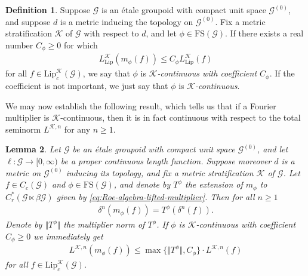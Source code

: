 \documentclass[11pt,a4paper,oneside,final,reqno]{amsart}
\newtheorem{lemma}{Lemma}[section]
\theoremstyle{definition}
\newtheorem{definition}[lemma]{Definition}
\newcommand{\G}{\mathcal{G}}
\newcommand{\Go}{\mathcal{G}^{(0)}}
\newcommand{\cK}{\mathcal{K}}
\newcommand{\FS}{\mathrm{FS}}
\newcommand{\Lip}{\mathrm{Lip}}
\newcommand{\Cred}{C_{r}^{*}}
\numberwithin{equation}{section}
\begin{document}
	
	\begin{definition}\label{def:K-continuous-multipliers}
		Suppose $\G$ is an \'etale groupoid with compact unit space $\Go$, and suppose  $d$ is a metric inducing the topology on $\Go$. 
		Fix  a metric stratification $\cK$ of $\G$ with respect to $d$, and 
		let $\phi \in \FS(\G)$. 
		If there exists a real number $C_\phi \geq 0$ for which
		\begin{align*}
			L_\mathrm{Lip}^\cK (m_\phi (f)) \leq C_\phi L_\mathrm{Lip}^\cK(f)
		\end{align*}
		for all 
		$f \in \Lip_c^{\cK}(\G)$,
		we say that $\phi$ is \emph{$\cK$-continuous with coefficient $C_\phi$}. If the coefficient is not important, we just say that $\phi$ is \emph{$\cK$-continuous}.
	\end{definition}
	
	We may now establish the following result, which tells us that if a Fourier multiplier is $\cK$-continuous, then 
	it
	is in fact continuous with respect to the total seminorm $L^{\cK, n}$ for any $n\geq 1$. 

	\begin{lemma}\label{lemma:multipliers-extend-to-Roe}
		Let $\G$ be an \'etale groupoid with compact unit space $\Go$, and let $\ell \colon \G \to [0,\infty)$ be a proper continuous length function. 
		Suppose moreover $d$ is a metric on $\Go$ inducing its topology,
		and fix a metric stratification $\cK$ of $\G$.
		Let $f \in C_c (\G)$ and $\phi \in \FS(\G)$, 
		and denote by $T^\phi$ 
		the extension of $m_\phi$ to $\Cred ( \G \ltimes \beta\G)$ given by \eqref{eq:Roe-algebra-lifted-multiplier}. 
		Then for all $n \geq 1$
		\begin{align*}
			\delta^n(m_\phi (f)) = T^\phi (\delta^n(f)).
		\end{align*}
		Denote by $\Vert T^\phi\Vert$ the multiplier norm of $T^\phi$. 
		If $\phi$ is $\cK$-continuous with coefficient $C_\phi \geq 0$ 
		we immediately get
		\begin{align*}
			L^{\cK,n} (m_\phi (f)) \leq \max \{ \Vert T^\phi \Vert , C_\phi  \} \cdot L^{\cK,n}(f)
		\end{align*}
		for all 
		$f \in \Lip_c^{\cK}(\G)$. 
	\end{lemma}
	
\end{document}
